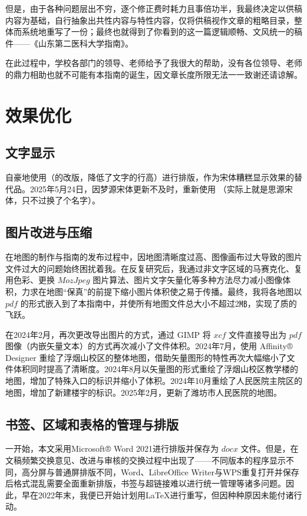但是，由于各种问题层出不穷，逐个修正费时耗力且事倍功半，我最终决定以供稿内容为基础，自行抽象出共性内容与特性内容，仅将供稿视作文章的粗略目录，整体而系统地重写了一份；最终也就得到了你看到的这一篇逻辑顺畅、文风统一的稿件——《山东第二医科大学指南》。

在此过程中，学校各部门的领导、老师给予了我很大的帮助，没有各位领导、老师的鼎力相助也就不可能有本指南的诞生，因文章长度所限无法一一致谢还请谅解。

\section[效果优化]{效果优化}
\subsection[文字显示]{文字显示}
自豪地使用（的改版，降低了文字的行高）进行排版，作为宋体糟糕显示效果的替代品。2025年5月24日，因梦源宋体更新不及时，重新使用 （实际上就是思源宋体，只不过换了个名字）。

\subsection[图片改进与压缩]{图片改进与压缩}
在地图的制作与指南的发布过程中，因地图清晰度过高、图像画布过大导致的图片文件过大\footnotemark 的问题始终困扰着我。在反复研究后，我通过非文字区域的马赛克化、复用色彩、更换 $MozJpeg$ 图片算法、图片文字矢量化等多种方法尽力减小图像体积，力求在地图“保真”的前提下缩小图片体积使之易于传播。最终，我将各地图以 $pdf$ 的形式嵌入到了本指南中，并使所有地图文件总大小不超过2㎆，实现了质的飞跃。

在2024年2月，再次更改导出图片的方式，通过 GIMP 将 $xcf$ 文件直接导出为 $pdf$ 图像（内嵌矢量文本）的方式再次减小了文件体积。2024年7月，使用 Affinity® Designer 重绘了浮烟山校区的整体地图，借助矢量图形的特性再次大幅缩小了文件体积同时提高了清晰度。2024年8月以矢量图的形式重绘了浮烟山校区教学楼的地图，增加了特殊入口的标识并缩小了体积。2024年10月重绘了人民医院主院区的地图，增加了新建楼宇的标识。2025年2月，更新了潍坊市人民医院的地图。

\subsection[书签、区域和表格的管理与排版]{书签、区域和表格的管理与排版}
一开始，本文采用Microsoft® Word 2021进行排版并保存为 $docx$ 文件。但是，在文稿频繁交换意见、改进与审核的交换过程中出现了——不同版本的程序显示不同，高分屏与普通屏排版不同，Word、LibreOffice Writer与WPS重复打开并保存后格式混乱需要全面重新排版，书签与超链接难以进行统一管理等诸多问题。因此，早在2022年末，我便已开始计划用\LaTeX 进行重写，但因种种原因未能付诸行动。

